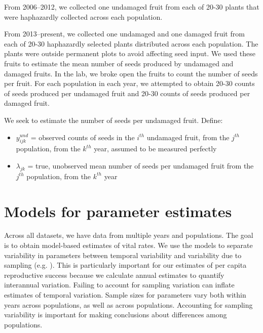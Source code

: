 \documentclass[12pt, oneside, titlepage]{article}   	%
\begin{document}
From 2006--2012, we collected one undamaged fruit from each of 20-30 plants that were haphazardly collected across each population.

From 2013--present, we collected one undamaged and one damaged fruit from each of 20-30 haphazardly selected plants distributed across each population. The plants were outside permanent plots to avoid affecting seed input. We used these fruits to estimate the mean number of seeds produced by undamaged and damaged fruits. In the lab, we broke open the fruits to count the number of seeds per fruit. For each population in each year, we attempted to obtain 20-30 counts of seeds produced per undamaged fruit and  20-30 counts of seeds produced per damaged fruit. 

We seek to estimate the number of seeds per undamaged fruit. Define:

\begin{itemize}
	\item $y^{und}_{ijk}$ = observed counts of seeds in the $i^{th}$ undamaged fruit, from the $j^{th}$ population, from the $k^{th}$ year, assumed to be measured perfectly
	\item $\lambda_{jk}$ = true, unobserved mean number of seeds per undamaged fruit from the $j^{th}$ population, from the $k^{th}$ year
\end{itemize}

\section{Models for parameter estimates}

Across all datasets, we have data from multiple years and populations. The goal is to obtain model-based estimates of vital rates. We use the models to separate variability in parameters between temporal variability and variability due to sampling (e.g. \cite{gould1998}). This is particularly important for our estimates of per capita reproductive success because we calculate annual estimates to quantify interannual variation. Failing to account for sampling variation can inflate estimates of temporal variation. Sample sizes for parameters vary both within years across populations, as well as across populations. Accounting for sampling variability is important for making conclusions about differences among populations. 
 
\end{document}
